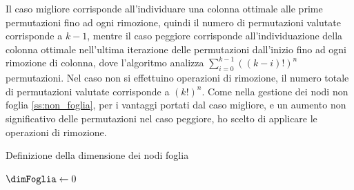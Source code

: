 \documentclass[a4paper,12pt]{report}
\begin{document}
  Il caso migliore corrisponde all'individuare una colonna ottimale alle prime permutazioni fino ad ogni rimozione, quindi il numero di permutazioni valutate corrisponde a $k-1$, mentre il caso peggiore corrisponde all'individuazione della colonna ottimale nell'ultima iterazione delle permutazioni dall'inizio fino ad ogni rimozione di colonna, dove l'algoritmo analizza  $\sum_{i=0}^{k-1} ((k-i)!)^n$ permutazioni. Nel caso non si effettuino operazioni di rimozione, il numero totale di permutazioni valutate corrisponde a $(k!)^n$. Come nella gestione dei nodi non foglia \ref{ss:non_foglia},
  per i vantaggi portati dal caso migliore, e un aumento non significativo delle permutazioni nel caso peggiore, ho scelto di applicare le operazioni di rimozione.

  \begin{algorithm}
  \caption{Definizione della dimensione dei nodi foglia}\label{alg:dimFoglia}

  $\dimFoglia \leftarrow 0$ \\
  \Return \dimFoglia \\

  \end{algorithm}
\end{document}
